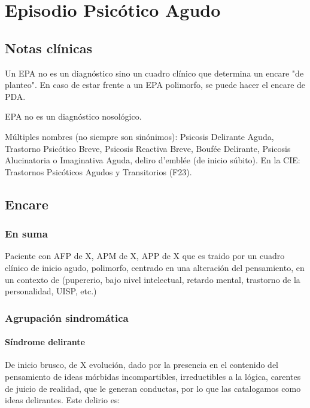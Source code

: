 \chapter{Episodio Psicótico Agudo}
\section*{Notas clínicas}
Un EPA no es un diagnóstico sino un cuadro clínico que determina un encare "de planteo". En caso de estar frente a un EPA polimorfo, se puede hacer el encare de PDA.

\faStopCircle EPA no es un diagnóstico nosológico.

Múltiples nombres (no siempre son sinónimos): Psicosis Delirante Aguda, Trastorno Psicótico Breve, Psicosis Reactiva Breve, Boufée Delirante, Psicosis Alucinatoria o Imaginativa Aguda, deliro d'emblée (de inicio súbito). En la CIE: Trastornos Psicóticos Agudos y Transitorios (F23).
\section*{Encare}
\subsection*{En suma}
Paciente con AFP de X, APM de X, APP de X que es traido por un cuadro clínico de inicio agudo, polimorfo, centrado en una alteración del pensamiento, en un contexto de (pupererio, bajo nivel intelectual, retardo mental, trastorno de la personalidad, UISP, etc.)
\subsection*{Agrupación sindromática}
\subsubsection*{Síndrome delirante}
De inicio brusco, de X evolución, dado por la presencia en el contenido del pensamiento de ideas mórbidas incompartibles, irreductibles a la lógica, carentes de juicio de realidad, que le generan conductas, por lo que las catalogamos como ideas delirantes. Este delirio es:


